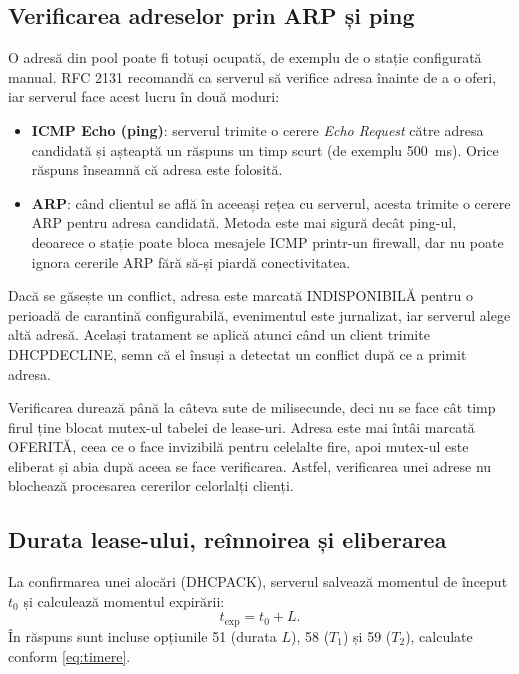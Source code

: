 \documentclass[conference]{IEEEtran}
\begin{document}
\subsection{Verificarea adreselor prin ARP și ping}\label{subsec:conflicte}
O adresă din pool poate fi totuși ocupată, de exemplu de o stație configurată manual. RFC 2131 \cite{rfc2131} recomandă ca serverul să verifice adresa înainte de a o oferi, iar serverul face acest lucru în două moduri:
\begin{itemize}
\item \textbf{ICMP Echo (ping)}: serverul trimite o cerere \textit{Echo Request} către adresa candidată și așteaptă un răspuns un timp scurt (de exemplu 500~ms). Orice răspuns înseamnă că adresa este folosită.
\item \textbf{ARP}: când clientul se află în aceeași rețea cu serverul, acesta trimite o cerere ARP pentru adresa candidată. Metoda este mai sigură decât ping-ul, deoarece o stație poate bloca mesajele ICMP printr-un firewall, dar nu poate ignora cererile ARP fără să-și piardă conectivitatea.
\end{itemize}

Dacă se găsește un conflict, adresa este marcată INDISPONIBILĂ pentru o perioadă de carantină configurabilă, evenimentul este jurnalizat, iar serverul alege altă adresă. Același tratament se aplică atunci când un client trimite DHCPDECLINE, semn că el însuși a detectat un conflict după ce a primit adresa.

Verificarea durează până la câteva sute de milisecunde, deci nu se face cât timp firul ține blocat mutex-ul tabelei de lease-uri. Adresa este mai întâi marcată OFERITĂ, ceea ce o face invizibilă pentru celelalte fire, apoi mutex-ul este eliberat și abia după aceea se face verificarea. Astfel, verificarea unei adrese nu blochează procesarea cererilor celorlalți clienți.

\subsection{Durata lease-ului, reînnoirea și eliberarea}\label{subsec:lease}
La confirmarea unei alocări (DHCPACK), serverul salvează momentul de început $t_0$ și calculează momentul expirării:
\begin{equation}
t_{\text{exp}} = t_0 + L .\label{eq:expirare}
\end{equation}
În răspuns sunt incluse opțiunile 51 (durata $L$), 58 ($T_1$) și 59 ($T_2$), calculate conform \eqref{eq:timere}.
\end{document}
